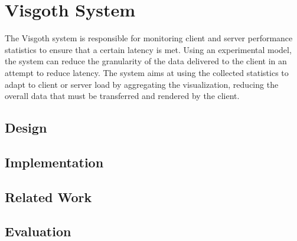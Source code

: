 \chapter{Visgoth System}\label{visgoth-ch}

The Visgoth system is responsible for monitoring client and server performance
statistics to ensure that a certain latency is met. Using an experimental
model, the system can reduce the granularity of the data delivered to the
client in an attempt to reduce latency. The system aims at using the collected
statistics to adapt to client or server load by aggregating the visualization,
reducing the overall data that must be transferred and rendered by the client. \\

\section{Design}
\section{Implementation}
\section{Related Work}
\section{Evaluation}
